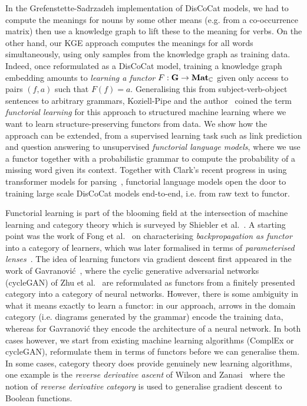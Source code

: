 In the Grefenstette-Sadrzadeh implementation of DisCoCat models, we had to compute the meanings for nouns by some other means (e.g. from a co-occurrence matrix) then use a knowledge graph to lift these to the meaning for verbs.
On the other hand, our KGE approach computes the meanings for all words simultaneously, using only samples from the knowledge graph as training data.
Indeed, once reformulated as a DisCoCat model, training a knowledge graph embedding amounts to \emph{learning a functor} $F : \mathbf{G} \to \mathbf{Mat}_{\mathbb{C}}$ given only access to pairs $(f, a)$ such that $F(f) = a$.
Generalising this from subject-verb-object sentences to arbitrary grammars, Koziell-Pipe and the author~\cite{ToumiKoziell-Pipe21} coined the term \emph{functorial learning} for this approach to structured machine learning where we want to learn structure-preserving functors from data.
We show how the approach can be extended, from a supervised learning task such as link prediction and question answering to unsupervised \emph{functorial language models}, where we use a functor together with a probabilistic grammar to compute the probability of a missing word given its context.
Together with Clark's recent progress in using transformer models for parsing~\cite{Clark21}, functorial language models open the door to training large scale DisCoCat models end-to-end, i.e. from raw text to functor.

Functorial learning is part of the blooming field at the intersection of machine learning and category theory which is surveyed by Shiebler et al.~\cite{ShieblerEtAl21}.
A starting point was the work of Fong et al.~\cite{FongEtAl19} on characterising \emph{backpropagation as functor} into a category of learners, which was later formalised in terms of \emph{parameterised lenses}~\cite[Lemma~2.13]{CruttwellEtAl21}.
The idea of learning functors via gradient descent first appeared in the work of Gavranović~\cite{Gavranovic19,Gavranovic19a}, where the cyclic generative adversarial networks (cycleGAN) of Zhu et al.~\cite{ZhuEtAl20} are reformulated as functors from a finitely presented category into a category of neural networks.
However, there is some ambiguity in what it means exactly to learn a functor: in our approach, arrows in the domain category (i.e. diagrams generated by the grammar) encode the training data, whereas for Gavranović they encode the architecture of a neural network.
In both cases however, we start from existing machine learning algorithms (ComplEx or cycleGAN), reformulate them in terms of functors before we can generalise them.
In some cases, category theory does provide genuinely new learning algorithms, one example is the \emph{reverse derivative ascent} of Wilson and Zanasi~\cite{WilsonZanasi20} where the notion of \emph{reverse derivative category} is used to generalise gradient descent to Boolean functions.
